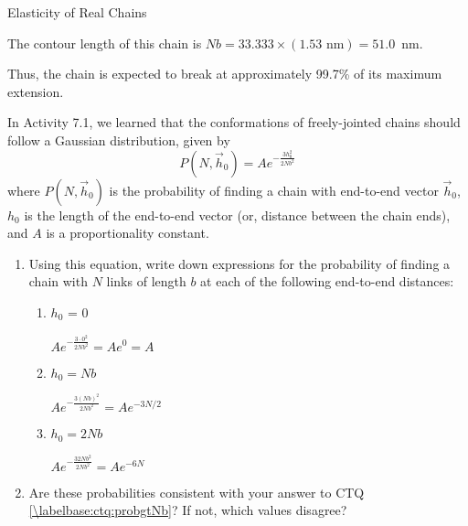 \begin{activity}[extension]{Elasticity of Real Chains}
\begin{exercises}
\begin{enumerate}
\begin{solution}{}
					The contour length of this chain is $Nb = 33.333\times(1.53\text{ nm}) = 51.0$~nm.
					
					Thus, the chain is expected to break at approximately 99.7\% of its maximum extension.
				\end{solution}
				
		\end{enumerate}
		
\exercise
	In Activity 7.1, we learned that the conformations of freely-jointed chains should follow a Gaussian distribution, given by
	\begin{equation*}
		P(N,\vec h_0) = A e^{-\frac{3 h_0^2}{2 N b^2}}
	\end{equation*}
	where $P(N,\vec h_0)$ is the probability of finding a chain with end-to-end vector $\vec h_0$,  $h_0$ is the length of the end-to-end vector (or, distance between the chain ends), and $A$ is a proportionality constant.

	\begin{enumerate} 
	
		\item Using this equation, write down expressions for the probability of finding a chain with $N$ links of length $b$ at each of the following end-to-end distances:
		
			\begin{enumerate}
			
				\item $h_0$ = 0
			
				\begin{solution}{}
					$Ae^{-\frac{3\cdot 0^2}{2Nb^2}} = Ae^0 = A$
				\end{solution}
				
				\item $h_0 = Nb$
			
				\begin{solution}{}
					$Ae^{-\frac{3(Nb)^2}{2Nb^2}} = Ae^{-3N/2}$
				\end{solution}
				
				\item $h_0 = 2Nb$
			
				\begin{solution}{}
					$Ae^{-\frac{3{2Nb}^2}{2Nb^2}} = Ae^{-6N}$
				\end{solution}
				
			\end{enumerate}
			
		\item Are these probabilities consistent with your answer to CTQ \ref{\labelbase:ctq:probgtNb}?  If not, which values disagree?
			

\end{enumerate}
\end{exercises}
\end{activity}

